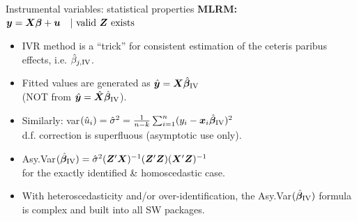 \documentclass[usenames,dvipsnames]{beamer}
\begin{document}
\begin{frame}{Instrumental variables: statistical properties}
\textbf{MLRM:} $\bm{y} = \bm{X\beta} + \bm{u} \quad |\textnormal{~valid} ~\bm{Z} \textnormal{~exists}$
\medskip
\begin{itemize}
\item IVR method is a ``trick'' for consistent estimation of the ceteris paribus effects, i.e. $\hat{\beta}_{j,\textnormal{IV}}$.
\medskip
\item Fitted values are generated as $\hat{\bm{y}} = \bm{X} \hat{\bm{\beta}}_{\textnormal{IV}}$\\
(NOT from $\hat{\bm{y}} = \hat{\bm{X}} \hat{\bm{\beta}}_{\textnormal{IV}}$).
\medskip
\item Similarly: var$(\hat{u}_i) = \hat{\sigma}^2 = \frac{1}{n-k} \sum_{i=1}^n (y_i - \bm{x}_i \hat{\bm{\beta}}_{\textnormal{IV}})^2$\\d.f. correction is superfluous (asymptotic use only). 
\medskip
\item Asy.Var$(\hat{\bm{\beta}}_{\textnormal{IV}}) = \hat{\sigma}^2
(\bm{Z}^{\prime}\bm{X})^{-1}(\bm{Z}^{\prime}\bm{Z})(\bm{X}^{\prime}\bm{Z})^{-1}
$\\
for the exactly identified \& homoscedastic case.
\medskip
\item With heteroscedasticity and/or over-identification, the Asy.Var$(\hat{\bm{\beta}}_{\textnormal{IV}})$ formula is complex and built into all SW packages.
\end{itemize}
\end{frame}
\end{document}
